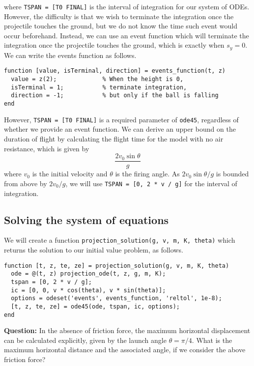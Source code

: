 \noindent
where \lstinline|TSPAN = [T0 FINAL]| is the interval of integration for our system of ODEs. However, the difficulty is that we wish to terminate the integration once the projectile touches the ground, but we do not know the time such event would occur beforehand. Instead, we can use an event function which will terminate the integration once the projectile touches the ground, which is exactly when $s_y = 0$. We can write the events function as follows.

\begin{lstlisting}
function [value, isTerminal, direction] = events_function(t, z)
  value = z(2);             % When the height is 0,
  isTerminal = 1;           % terminate integration,
  direction = -1;           % but only if the ball is falling
end
\end{lstlisting}

\noindent
However, \lstinline|TSPAN = [T0 FINAL]| is a required parameter of \lstinline|ode45|, regardless of whether we provide an event function. We can derive an upper bound on the duration of flight by calculating the flight time for the model with no air resistance, which is given by
$$\frac{2v_0 \sin\theta}{g}$$
where $v_0$ is the initial velocity and $\theta$ is the firing angle. As $2v_0 \sin\theta / g$ is bounded from above by $2v_0 / g$, we will use \lstinline|TSPAN = [0, 2 * v / g]| for the interval of integration.



\subsection{Solving the system of equations}
\noindent
We will create a function \lstinline|projection_solution(g, v, m, K, theta)| which returns the solution to our initial value problem, as follows.

\begin{lstlisting}
function [t, z, te, ze] = projection_solution(g, v, m, K, theta)
  ode = @(t, z) projection_ode(t, z, g, m, K);
  tspan = [0, 2 * v / g];
  ic = [0, 0, v * cos(theta), v * sin(theta)];
  options = odeset('events', events_function, 'reltol', 1e-8);
  [t, z, te, ze] = ode45(ode, tspan, ic, options);
end
\end{lstlisting}

$ $\\
\noindent
\textbf{Question:} In the absence of friction force, the maximum horizontal displacement can be calculated explicitly, given by the launch angle $\theta = \pi / 4$. What is the maximum horizontal distance and the associated angle, if we consider the above friction force?

